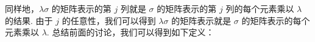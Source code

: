 同样地，$\lambda \sigma$ 的矩阵表示的第 $j$ 列就是 $\sigma$ 的矩阵表示的第 $j$ 列的每个元素乘以 $\lambda$ 的结果. 由于 $j$ 的任意性，我们可以得到 $\lambda \sigma$ 的矩阵表示就是 $\sigma$ 的矩阵表示的每个元素乘以 $\lambda$. 总结前面的讨论，我们可以得到如下定义：


